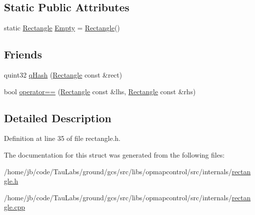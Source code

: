 \subsection*{\-Static \-Public \-Attributes}
\begin{DoxyCompactItemize}
\item 
static \hyperlink{structinternals_1_1_rectangle}{\-Rectangle} \hyperlink{group___o_p_map_widget_ga747b738c524d1f0bb7b4a00e9de42da4}{\-Empty} = \hyperlink{structinternals_1_1_rectangle}{\-Rectangle}()
\end{DoxyCompactItemize}
\subsection*{\-Friends}
\begin{DoxyCompactItemize}
\item 
quint32 \hyperlink{group___o_p_map_widget_ga147a59b523f242e2fe2549b016688b2c}{q\-Hash} (\hyperlink{structinternals_1_1_rectangle}{\-Rectangle} const \&rect)
\item 
bool \hyperlink{group___o_p_map_widget_ga49a8cb6dd0aff741dcae36e54dedd8be}{operator==} (\hyperlink{structinternals_1_1_rectangle}{\-Rectangle} const \&lhs, \hyperlink{structinternals_1_1_rectangle}{\-Rectangle} const \&rhs)
\end{DoxyCompactItemize}


\subsection{\-Detailed \-Description}


\-Definition at line 35 of file rectangle.\-h.



\-The documentation for this struct was generated from the following files\-:\begin{DoxyCompactItemize}
\item 
/home/jb/code/\-Tau\-Labs/ground/gcs/src/libs/opmapcontrol/src/internals/\hyperlink{rectangle_8h}{rectangle.\-h}\item 
/home/jb/code/\-Tau\-Labs/ground/gcs/src/libs/opmapcontrol/src/internals/\hyperlink{rectangle_8cpp}{rectangle.\-cpp}\end{DoxyCompactItemize}
